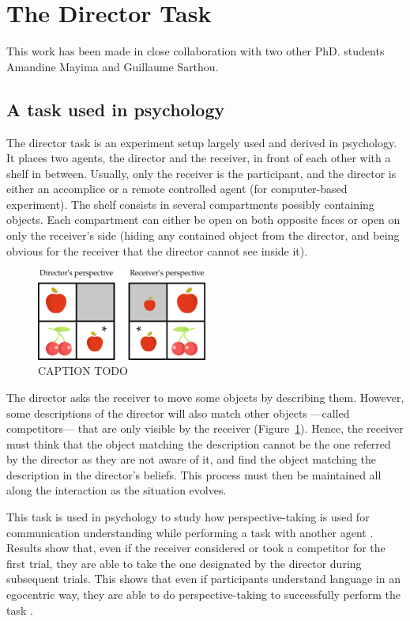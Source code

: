 \documentclass[a4paper,11pt,twoside]{StyleThese}
\begin{document}
\section{The Director Task}
This work has been made in close collaboration with two other PhD. students Amandine Mayima and Guillaume Sarthou. 

\subsection{A task used in psychology}
The director task is an experiment setup largely used and derived in psychology. It places two agents, the director and the receiver, in front of each other with a shelf in between. Usually, only the receiver is the participant, and the director is either an accomplice or a remote controlled agent (for computer-based experiment). The shelf consists in several compartments possibly containing objects. Each compartment can either be open on both opposite faces or open on only the receiver's side (hiding any contained object from the director, and being obvious for the receiver that the director cannot see inside it).

\begin{figure}[hbtp]
\centering
\includegraphics[width=0.5\textwidth]{figures/chapter4/dt_apple.png}
\caption{CAPTION TODO}
\label{fig:chap4dtapple}
\end{figure}

The director asks the receiver to move some objects by describing them. However, some descriptions of the director will also match other objects ---called competitors--- that are only visible by the receiver (Figure~\ref{fig:chap4dtapple}). Hence, the receiver must think that the object matching the description cannot be the one referred by the director as they are not aware of it, and find the object matching the description in the director's beliefs. This process must then be maintained all along the interaction as the situation evolves.

This task is used in psychology to study how perspective-taking is used for communication understanding while performing a task with another agent \cite{keysar2000taking}. Results show that, even if the receiver considered or took a competitor for the first trial, they are able to take the one designated by the director during subsequent trials. This shows that even if participants understand language in an egocentric way, they are able to do perspective-taking to successfully perform the task \cite{keysar2003limits}. 
\end{document}
